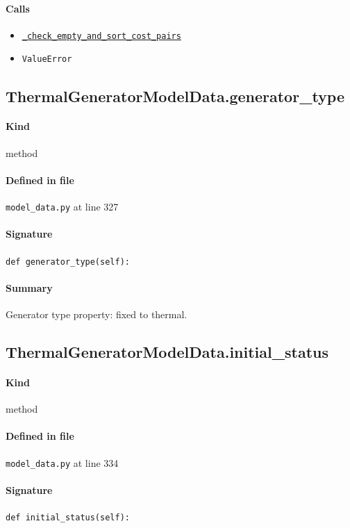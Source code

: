 \documentclass[11pt]{report}
\begin{document}
\paragraph{Calls}
\begin{itemize}[leftmargin=*]
  \item \hyperref[def:model_data.py:ThermalGeneratorModelData._check_empty_and_sort_cost_pairs:L245]{\texttt{\_check\_empty\_and\_sort\_cost\_pairs}}
  \item \texttt{ValueError}
\end{itemize}
\subsection{ThermalGeneratorModelData.generator\_type}
\label{def:model_data.py:ThermalGeneratorModelData.generator_type:L327}
\paragraph{Kind} method
\paragraph{Defined in file} \texttt{model\_data.py} at line 327
\paragraph{Signature} \texttt{def generator\_type(self):}
\paragraph{Summary} Generator type property: fixed to thermal.
\subsection{ThermalGeneratorModelData.initial\_status}
\label{def:model_data.py:ThermalGeneratorModelData.initial_status:L334}
\paragraph{Kind} method
\paragraph{Defined in file} \texttt{model\_data.py} at line 334
\paragraph{Signature} \texttt{def initial\_status(self):}
\end{document}
